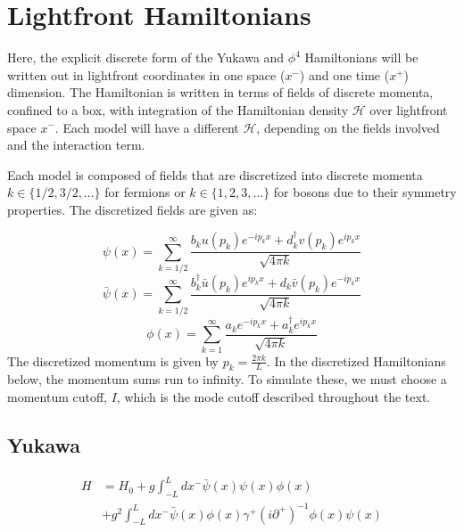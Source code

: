 \section{Lightfront Hamiltonians}
\label{subsec:lightfront-hamiltonian}

Here, the explicit discrete form of the Yukawa and $\phi^4$ Hamiltonians will be written out in lightfront coordinates in one space ($x^-$) and one time ($x^+$) dimension.
The Hamiltonian is written in terms of fields of discrete momenta, confined to a box, with integration of the Hamiltonian density $\mathcal{H}$ over lightfront space $x^-$. Each model will have a different $\mathcal{H}$, depending on the fields involved and the interaction term.

Each model is composed of fields that are discretized into discrete momenta $k \in \{1/2, 3/2, \dots\}$ for fermions or $k \in \{1, 2, 3, \dots\}$ for bosons due to their symmetry properties. 
The discretized fields are given as:

\begin{equation}
    \label{eq:psi_discrete}
    \psi(x) = \sum_{k = 1/2}^\infty\frac{b_k u(p_k)e^{-ip_k x} + d_k^\dagger v(p_k)e^{ip_k x}}{\sqrt{4\pi k}}
\end{equation}
\begin{equation}
    \label{eq:psibar_discrete}
    \bar \psi(x)= \sum_{k = 1/2}^\infty\frac{b_k^\dagger \bar u(p_k)e^{ip_k x} + d_k \bar v(p_k)e^{-ip_k x}}{\sqrt{4\pi k}}
\end{equation}
\begin{equation}
    \label{eq:phi_discrete}
    \phi(x) = \sum_{k = 1}^\infty\frac{a_k e^{-ip_k x} + a_k^\dagger e^{ip_k x}}{\sqrt{4\pi k}}
\end{equation}
The discretized momentum is given by $p_k = \frac{2\pi k}{L}$. In the discretized Hamiltonians below, the momentum sums run to infinity. To simulate these, we must choose a momentum cutoff, $I$, which is the mode cutoff described throughout the text. 


\subsection{Yukawa}
\begin{align}
    \label{eq:yukawa-hamiltonian-fields}
    H &= H_0 + g\int_{-L}^L dx^- \bar \psi(x) \psi(x) \phi(x)\\ 
    &+ g^2\int_{-L}^L  dx^- \bar \psi(x) \phi(x) \gamma^+\left(i\partial^+ \right)^{-1}\phi(x) \psi(x) \nonumber
\end{align}




